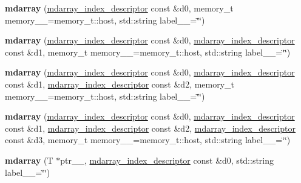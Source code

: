 \begin{DoxyCompactItemize}
\item 
\hypertarget{classsddk_1_1mdarray_af450a8198e7a8127ebdf90ff9a097bae}{}{\bfseries mdarray} (\hyperlink{classsddk_1_1mdarray__index__descriptor}{mdarray\+\_\+index\+\_\+descriptor} const \&d0, memory\+\_\+t memory\+\_\+\+\_\+=memory\+\_\+t\+::host, std\+::string label\+\_\+\+\_\+=\char`\"{}\char`\"{})\label{classsddk_1_1mdarray_af450a8198e7a8127ebdf90ff9a097bae}

\item 
\hypertarget{classsddk_1_1mdarray_ae45c9136ca39996a46fec089fc8e6227}{}{\bfseries mdarray} (\hyperlink{classsddk_1_1mdarray__index__descriptor}{mdarray\+\_\+index\+\_\+descriptor} const \&d0, \hyperlink{classsddk_1_1mdarray__index__descriptor}{mdarray\+\_\+index\+\_\+descriptor} const \&d1, memory\+\_\+t memory\+\_\+\+\_\+=memory\+\_\+t\+::host, std\+::string label\+\_\+\+\_\+=\char`\"{}\char`\"{})\label{classsddk_1_1mdarray_ae45c9136ca39996a46fec089fc8e6227}

\item 
\hypertarget{classsddk_1_1mdarray_a0700afd24922d448179986f747215215}{}{\bfseries mdarray} (\hyperlink{classsddk_1_1mdarray__index__descriptor}{mdarray\+\_\+index\+\_\+descriptor} const \&d0, \hyperlink{classsddk_1_1mdarray__index__descriptor}{mdarray\+\_\+index\+\_\+descriptor} const \&d1, \hyperlink{classsddk_1_1mdarray__index__descriptor}{mdarray\+\_\+index\+\_\+descriptor} const \&d2, memory\+\_\+t memory\+\_\+\+\_\+=memory\+\_\+t\+::host, std\+::string label\+\_\+\+\_\+=\char`\"{}\char`\"{})\label{classsddk_1_1mdarray_a0700afd24922d448179986f747215215}

\item 
\hypertarget{classsddk_1_1mdarray_ae2be002943d03b96be432fdb50467ac2}{}{\bfseries mdarray} (\hyperlink{classsddk_1_1mdarray__index__descriptor}{mdarray\+\_\+index\+\_\+descriptor} const \&d0, \hyperlink{classsddk_1_1mdarray__index__descriptor}{mdarray\+\_\+index\+\_\+descriptor} const \&d1, \hyperlink{classsddk_1_1mdarray__index__descriptor}{mdarray\+\_\+index\+\_\+descriptor} const \&d2, \hyperlink{classsddk_1_1mdarray__index__descriptor}{mdarray\+\_\+index\+\_\+descriptor} const \&d3, memory\+\_\+t memory\+\_\+\+\_\+=memory\+\_\+t\+::host, std\+::string label\+\_\+\+\_\+=\char`\"{}\char`\"{})\label{classsddk_1_1mdarray_ae2be002943d03b96be432fdb50467ac2}

\item 
\hypertarget{classsddk_1_1mdarray_a953b63916797b84950daec965c91dfbd}{}{\bfseries mdarray} (T $\ast$ptr\+\_\+\+\_\+, \hyperlink{classsddk_1_1mdarray__index__descriptor}{mdarray\+\_\+index\+\_\+descriptor} const \&d0, std\+::string label\+\_\+\+\_\+=\char`\"{}\char`\"{})\label{classsddk_1_1mdarray_a953b63916797b84950daec965c91dfbd}


\end{DoxyCompactItemize}
